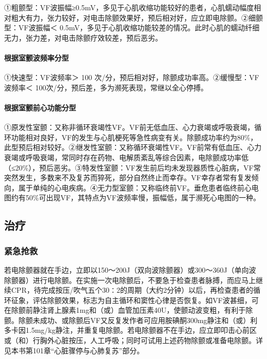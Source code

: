 ①粗颤型：VF波振幅≥0.5mV，多见于心肌收缩功能较好的患者，心肌蠕动幅度相对粗大有力，张力较好，对电击除颤效果好，预后相对好，应立即电除颤。②细颤型：VF波振幅＜
0.5mV，多见于心肌收缩功能较差的情况。此时心肌的蠕动纤细无力，张力差，对电击除颤疗效较差，预后恶劣。

\paragraph{根据室颤波频率分型}

①快速型：VF波频率＞ 100
次/分，预后相对好，除颤成功率高。②缓慢型：VF波频率＜
100次/分，预后差，多为濒死表现，常继以全心停搏。

\paragraph{根据室颤前心功能分型}

①原发性室颤：又称非循环衰竭性VF。VF前无低血压、心力衰竭或呼吸衰竭，循环功能相对良好，VF的发生与心肌梗死等急性病变有关。除颤成功率约为80\%，此型预后相对较好。②继发性室颤：又称循环衰竭性VF。VF前常有低血压、心力衰竭或呼吸衰竭，常同时存在药物、电解质紊乱等综合因素，电除颤成功率低（≤20\%），预后恶劣。③特发性室颤：VF发生前后均未发现器质性心脏病，VF常突然发生，多数来不及复苏而猝死，部分自然终止而幸存。VF幸存者常有复发倾向，属于单纯的心电疾病。④无力型室颤：又称临终前VF。垂危患者临终前心电图约有50\%可出现VF，其特点为VF波频率慢，振幅低，属于濒死心电图的一种。

\subsection{治疗}

\subsubsection{紧急抢救}

若电除颤器就在手边，立即以150～200J（双向波除颤器）或300～360J（单向波除颤器）进行电除颤。在实施一次电除颤后，不要急于检查患者脉搏，而应马上继续CPR，待完成按压/吹气五个30∶2的周期（大约2分钟）以后，再检查患者的循环征象，评估除颤效果，标志为自主循环和窦性心律是否恢复。如VF波甚细，可在除颤前静注肾上腺素1mg和（或）血管加压素40U，使颤动波变粗，有利于除颤。除颤未成功、或除颤后VF又反复发作者可应用胺碘酮300mg静注和（或）利多卡因1.5mg/kg静注，并重复电除颤。若电除颤器不在手边，应立即叩击心前区或（和）行胸外心脏按压，人工呼吸；同时可试用上述药物除颤或准备电除颤。详见本书第101章“心脏骤停与心肺复苏”部分。

